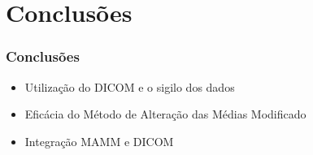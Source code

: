 \documentclass{beamer}
\begin{document}
\section{Conclusões}
\begin{frame}[fragile] %
\frametitle{Conclusões}
\begin{itemize}

\item Utilização do DICOM e o sigilo dos dados\newline

\item Eficácia do Método de Alteração das Médias Modificado \newline

\item Integração MAMM e DICOM \newline

\end{itemize}
\end{frame}
\end{document}
